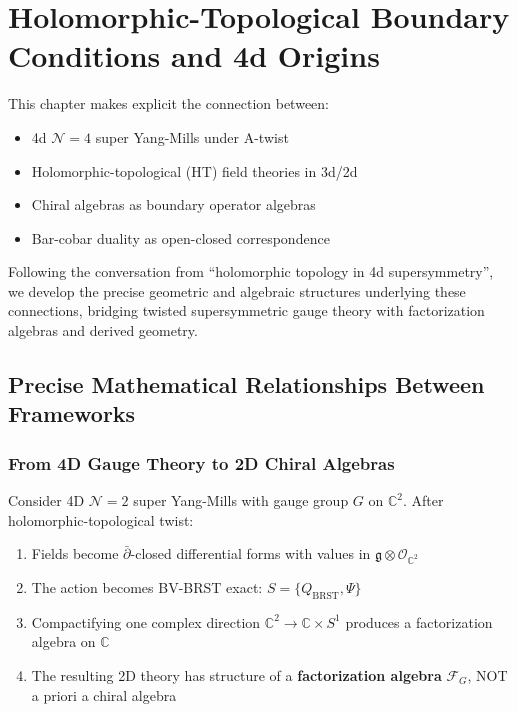 \chapter{Holomorphic-Topological Boundary Conditions and 4d Origins}
\label{ch:ht-boundary}

\begin{remark}
This chapter makes explicit the connection between:
\begin{itemize}
\item 4d $\mathcal{N}=4$ super Yang-Mills under A-twist
\item Holomorphic-topological (HT) field theories in 3d/2d
\item Chiral algebras as boundary operator algebras
\item Bar-cobar duality as open-closed correspondence
\end{itemize}

Following the conversation from ``holomorphic topology in 4d supersymmetry'', we 
develop the precise geometric and algebraic structures underlying these connections, 
bridging twisted supersymmetric gauge theory with factorization algebras and 
derived geometry.
\end{remark}


\section{Precise Mathematical Relationships Between Frameworks}
\label{sec:precise-relationships-frameworks}

\subsection{From 4D Gauge Theory to 2D Chiral Algebras}

\begin{theorem}\label{thm:costello-li-reduction}
\cite{CL16} Consider 4D $\mathcal{N}=2$ super Yang-Mills with gauge group $G$ 
on $\mathbb{C}^2$. After holomorphic-topological twist:
\begin{enumerate}
\item Fields become $\bar{\partial}$-closed differential forms with values in 
      $\mathfrak{g} \otimes \mathcal{O}_{\mathbb{C}^2}$
      
\item The action becomes BV-BRST exact: $S = \{Q_{\text{BRST}}, \Psi\}$

\item Compactifying one complex direction $\mathbb{C}^2 \to \mathbb{C} \times S^1$ 
      produces a factorization algebra on $\mathbb{C}$
      
\item The resulting 2D theory has structure of a \textbf{factorization algebra} 
      $\mathcal{F}_G$, NOT a priori a chiral algebra
\end{enumerate}
\end{theorem}

